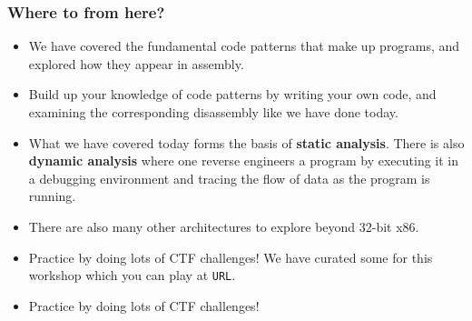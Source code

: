 \documentclass{beamer}
\begin{document}
\begin{frame}
\frametitle{Where to from here?}
\begin{itemize}
  \item We have covered the fundamental code patterns that make up programs, and explored
  how they appear in assembly.

  \item Build up your knowledge of code patterns
  by writing your own code, and examining the corresponding disassembly like we have done today.

  \item What we have covered today forms the basis of \textbf{static analysis}.
  There is also \textbf{dynamic analysis} where one reverse engineers a program by
  executing it in a debugging environment and tracing the flow of data as the program is running.

  \item There are also many other architectures to explore beyond 32-bit x86.

  \item Practice by doing lots of CTF challenges! We have curated some for this workshop which you
      can play at \texttt{URL}.
  \item Practice by doing lots of CTF challenges!
\end{itemize}
\end{frame}
\end{document}
